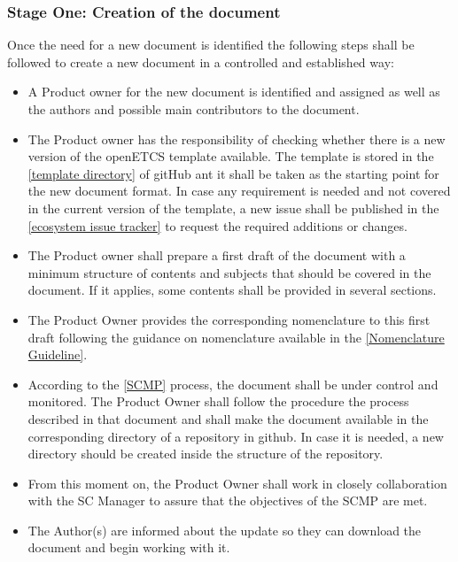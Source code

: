 \documentclass{template/openetcs_article}
\begin{document}
\subsubsection{Stage One: Creation of the document}

Once the need for a new document is identified the following steps shall be followed to create a new document in a controlled and established way:
\begin{itemize}

\item A Product owner for the new document is identified and assigned as well as the authors and possible main contributors to the document. 
\item The Product owner has the responsibility of checking whether there is a new version of the openETCS template available. The template is stored in the \href{https://github.com/openETCS/ecosystem/tree/master/openETCS_LateX_templates}{[template directory]} of gitHub ant it shall be taken as the starting point for the new document format. In case any requirement is needed and not covered in the current version of the template, a new issue shall be published in the \href{https://github.com/openETCS/ecosystem/issues}{[ecosystem issue tracker]} to request the required additions or changes.
\item The Product owner shall prepare a first draft of the document with a minimum structure of contents and subjects that should be covered in the document. If it applies, some contents shall be provided in several sections.
\item The Product Owner provides the corresponding nomenclature to this first draft following the guidance on nomenclature available in the \href{https://github.com/openETCS/governance/wiki/Nomenclature-Guideline}{[Nomenclature Guideline]}.
\item According to the \href{https://github.com/openETCS/governance/tree/master/SCMP}{[SCMP]} process, the document shall be under control and monitored. The Product Owner shall follow the procedure the process described in that document and shall make the document available in the corresponding directory of a repository in github. In case it is needed, a new directory should be created inside the structure of the repository. 
\item From this moment on, the Product Owner shall work in closely collaboration with the SC Manager to assure that the objectives of the SCMP are met.
\item The Author(s) are informed about the update so they can download the document and begin working with it.

\end{itemize}
\end{document}
